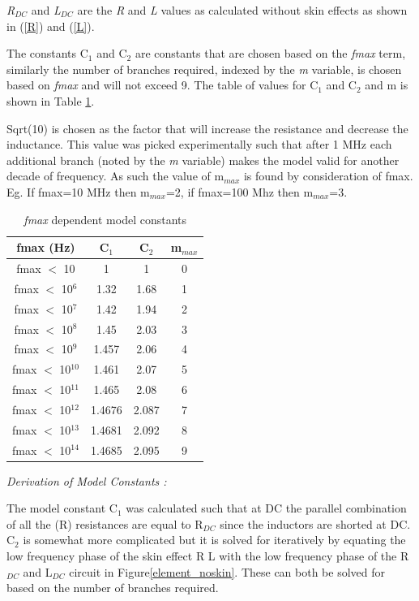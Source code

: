 \documentclass{article}
\begin{document}
{\noindent\emph{R$_{DC}$} and \emph{L$_{DC}$} are the \emph{R} and \emph{L} values as calculated without skin effects as shown in (\ref{R}) and (\ref{L}).

The constants C$_1$ and C$_2$ are constants that are chosen based on the \emph{fmax} term, similarly the number of branches required, indexed by the \emph{m} variable, is chosen based on \emph{fmax} and will not exceed 9.  The table of values for C$_1$ and C$_2$ and m is shown in Table \ref{constants_table}.

 Sqrt(10) is chosen as the factor that will increase the resistance and decrease the inductance.  This value was picked experimentally such that after 1 MHz each additional branch (noted by the \emph{m} variable) makes the model valid for another decade of frequency.  As such the value of m$_{max}$ is found by consideration of fmax.  Eg. If fmax=10 MHz then m$_{max}$=2, if fmax=100 Mhz then m$_{max}$=3.
 \newline
\begin{table}[h]
\begin{center}
\begin{tabular}{|c|c|c|c|}
\hline
   fmax (Hz)   &C$_1$&C$_2$&m$_{max}$\\
\hline
   fmax $<$ 10    & 1 & 1& 0 \\
\hline
   fmax $<$ 10$^6$    & 1.32 & 1.68& 1 \\
\hline
   fmax $<$ 10$^7$    & 1.42 & 1.94& 2 \\
\hline
   fmax $<$ 10$^8$    & 1.45 & 2.03& 3 \\
\hline
   fmax $<$ 10$^9$    & 1.457 & 2.06& 4 \\
\hline
   fmax $<$ 10$^{10}$    & 1.461 & 2.07& 5 \\
\hline
   fmax $<$ 10$^{11}$    & 1.465 & 2.08& 6 \\
\hline
   fmax $<$ 10$^{12}$    & 1.4676 & 2.087& 7 \\
\hline
   fmax $<$ 10$^{13}$    & 1.4681 & 2.092& 8 \\
\hline
   fmax $<$ 10$^{14}$    & 1.4685 & 2.095& 9 \\
\hline
\end{tabular}
\caption{\label{constants_table}\emph{fmax} dependent model constants}
\end{center}
\end{table}
\newline
\textit{Derivation of Model Constants : }
\newline

The model constant C$_1$ was calculated such that at DC the parallel combination of all the (R) resistances are equal to R$_{DC}$ since the inductors are shorted at DC.  C$_2$ is somewhat more complicated but it is solved for iteratively by equating the low frequency phase of the skin effect R L with the low frequency phase of the R$_{DC}$ and L$_{DC}$ circuit in Figure\ref{element_noskin}. These can both be solved for based on the number of branches required.

}
\end{document}

